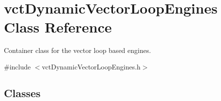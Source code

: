 \hypertarget{classvct_dynamic_vector_loop_engines}{\section{vct\-Dynamic\-Vector\-Loop\-Engines Class Reference}
\label{classvct_dynamic_vector_loop_engines}
}


Container class for the vector loop based engines.  




{\ttfamily \#include $<$vct\-Dynamic\-Vector\-Loop\-Engines.\-h$>$}

\subsection*{Classes}
